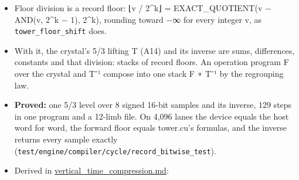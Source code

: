 \begin{itemize}
\begin{itemize}
\item Floor division is a record floor: ⌊v / 2\textasciicircum{}k⌋ = EXACT\_\allowbreak{}QUOTIENT(v − AND(v, 2\textasciicircum{}k − 1), 2\textasciicircum{}k), rounding toward −∞ for every integer v, as \texttt{tower\_\allowbreak{}floor\_\allowbreak{}shift} does.
\item With it, the crystal's 5/3 lifting T (A14) and its inverse are sums, differences, constants and that division: stacks of record floors. An operation program F over the crystal and T⁻¹ compose into one stack F ∘ T⁻¹ by the regrouping law.
\item \textbf{Proved:} one 5/3 level over 8 signed 16-bit samples and its inverse, 129 steps in one program and a 12-limb file. On 4,096 lanes the device equals the host word for word, the forward floor equals tower.cu's formulas, and the inverse returns every sample exactly (\texttt{test/\allowbreak{}engine/\allowbreak{}compiler/\allowbreak{}cycle/\allowbreak{}record\_\allowbreak{}bitwise\_\allowbreak{}test}).
\item Derived in \hyperref[chap:vertical-time-compression]{vertical\_\allowbreak{}time\_\allowbreak{}compression.md}:


\end{itemize}
\end{itemize}
